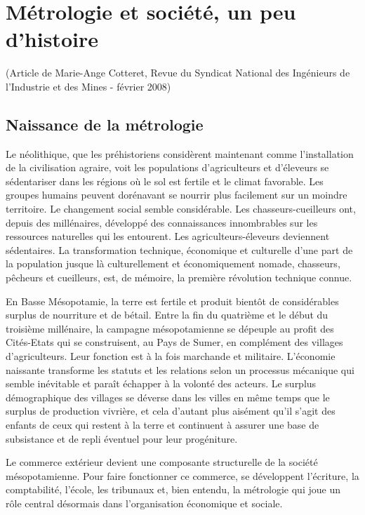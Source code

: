 \documentclass[main.tex]{subfiles}
\begin{document}
\section{Métrologie et société, un peu d'histoire}

(Article de Marie-Ange Cotteret, Revue du Syndicat National des Ingénieurs de l'Industrie et des Mines - février 2008)

\sl

\subsection{Naissance de la métrologie}

Le néolithique, que les préhistoriens considèrent maintenant comme l'installation de la civilisation agraire, voit les populations d'agriculteurs et d'éleveurs se sédentariser dans les régions où le sol est fertile et le climat favorable. Les groupes humains peuvent dorénavant se nourrir plus facilement sur un moindre territoire.  Le changement social semble considérable. Les chasseurs-cueilleurs ont, depuis des millénaires, développé des connaissances innombrables sur les ressources naturelles qui les entourent. Les agriculteurs-éleveurs deviennent sédentaires.  La transformation technique, économique et culturelle d'une part de la population jusque là culturellement et économiquement nomade, chasseurs, pêcheurs et cueilleurs, est, de mémoire, la première révolution technique connue.

En Basse Mésopotamie, la terre est fertile et produit bientôt de considérables surplus de nourriture et de bétail. Entre la fin du quatrième et le début du troisième millénaire, la campagne mésopotamienne se dépeuple au profit des Cités-Etats qui se construisent, au Pays de Sumer, en complément des villages d'agriculteurs.  Leur fonction est à la fois marchande et militaire.  L'économie naissante transforme les statuts et les relations selon un processus mécanique qui semble inévitable et paraît échapper à la volonté des acteurs. Le surplus démographique des villages se déverse dans les villes en même temps que le surplus de production vivrière, et cela d'autant plus aisément qu'il s'agit des enfants de ceux qui restent à la terre et continuent à assurer une base de subsistance et de repli éventuel pour leur progéniture.

Le commerce extérieur devient une composante structurelle de la société mésopotamienne. Pour faire fonctionner ce commerce, se développent l'écriture, la comptabilité, l'école, les tribunaux et, bien entendu, la métrologie qui joue un rôle central désormais dans l'organisation économique et sociale.
\end{document}
